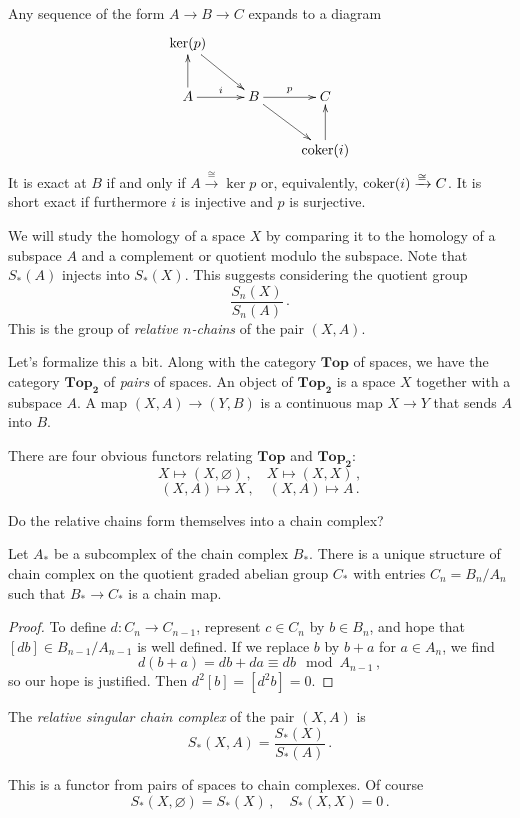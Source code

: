 Any sequence of the form $A\to B\to C$ expands to a diagram
	\begin{equation*}
	\xymatrix{\ker(p) \ar[dr] & & \\
	A\ar[u]\ar[r]^i & B\ar[r]^p\ar[dr] & C\\
	 & & \coker(i)\ar[u]}
	\end{equation*}
It is exact at $B$ if and only if $A\xrightarrow{\cong}\ker p$ or, equivalently,
$\operatorname{coker}(i)\xrightarrow{\cong}C$. It is short exact if furthermore $i$ is
injective and $p$ is surjective.

We will study the homology of a space $X$ by comparing it to the homology of a subspace $A$ and a complement or quotient modulo the subspace.
Note that $S_*(A)$ injects into $S_*(X)$. This suggests considering the quotient group
\[
\frac{S_n(X)}{S_n(A)}\,.
\]
This is the group of {\em relative $n$-chains} of the pair $(X,A)$. 

Let's formalize this a bit. Along with the category $\mathbf{Top}$ of spaces,
we have the category $\mathbf{Top_2}$ of {\em pairs} of spaces. An object of
$\mathbf{Top_2}$ is a space $X$ together with a subspace $A$. A map
$(X,A)\to(Y,B)$ is a continuous map $X\to Y$ that sends $A$ into $B$. 

There are four obvious functors relating $\mathbf{Top}$ and $\mathbf{Top_2}$:
\[
X\mapsto(X,\varnothing)\,,\quad X\mapsto(X,X)\,,
\]
\[
(X,A)\mapsto X\,,\quad(X,A)\mapsto A\,.
\]

Do the relative chains form themselves into a chain complex? 
\begin{lemma}
Let $A_*$ be a subcomplex of the chain complex $B_*$. There is a unique
structure of chain complex on the quotient graded abelian group $C_*$ with 
entries $C_n=B_n/A_n$ such that $B_*\to C_*$ is a chain map.
\end{lemma}
\begin{proof}
To define $d:C_n\to C_{n-1}$, represent $c\in C_n$ by $b\in B_n$, and
hope that $[db]\in B_{n-1}/A_{n-1}$ is well defined. If we replace
$b$ by $b+a$ for $a\in A_n$, we find 
\[
d(b+a)=db+da\equiv db\mod A_{n-1}\,,
\]
so our hope is justified. Then $d^2[b]=[d^2 b]=0$. 
\end{proof}

\begin{definition} The {\em relative singular chain complex} of the pair 
$(X,A)$ is 
\[
S_*(X,A)=\frac{S_*(X)}{S_*(A)}\,.
\]
\end{definition}
This is a functor from pairs of spaces to chain complexes. Of course
\[
S_*(X,\varnothing)=S_*(X)\,,\quad S_*(X,X)=0\,.
\]

